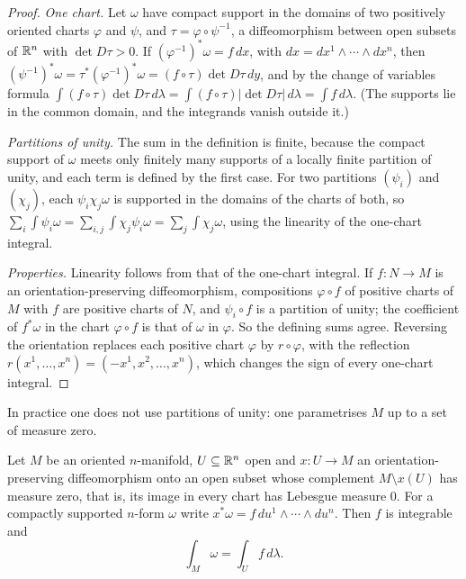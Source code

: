 \begin{proof}
\emph{One chart.} Let $\omega$ have compact support in the domains of two positively oriented charts $\varphi$ and $\psi$, and $\tau = \varphi \circ \psi^{-1}$, a diffeomorphism between open subsets of
$\mathbb{R}^n$ with $\det D\tau > 0$. If $(\varphi^{-1})^*\omega = f\,dx$, with $dx = dx^1 \wedge \cdots \wedge dx^n$, then $(\psi^{-1})^*\omega = \tau^*(\varphi^{-1})^*\omega = (f \circ \tau)\det D\tau\,dy$, and by the
change of variables formula $\int(f \circ \tau)\det D\tau\,d\lambda = \int(f \circ \tau)|\det D\tau|\,d\lambda = \int f\,d\lambda$. (The supports lie in the common domain, and the integrands vanish
outside it.)

\emph{Partitions of unity.} The sum in the definition is finite, because the compact support of $\omega$ meets only finitely many supports of a locally finite partition of unity, and
each term is defined by the first case. For two partitions $(\psi_i)$ and $(\chi_j)$, each $\psi_i\chi_j\omega$ is supported in the domains of the charts of both, so
$\sum_i\int\psi_i\omega = \sum_{i,j}\int\chi_j\psi_i\omega = \sum_j\int\chi_j\omega$, using the linearity of the one-chart integral.

\emph{Properties.} Linearity follows from that of the one-chart integral. If $f \colon N \to M$ is an orientation-preserving diffeomorphism, compositions $\varphi \circ f$ of positive charts of
$M$ with $f$ are positive charts of $N$, and $\psi_i \circ f$ is a partition of unity; the coefficient of $f^*\omega$ in the chart $\varphi \circ f$ is that of $\omega$ in $\varphi$. So the defining sums
agree. Reversing the orientation replaces each positive chart $\varphi$ by $r \circ \varphi$, with the reflection $r(x^1, \ldots, x^n) = (-x^1, x^2, \ldots, x^n)$, which changes the sign of every
one-chart integral.
\end{proof}

In practice one does not use partitions of unity: one parametrises $M$ up to a set of measure zero.

\begin{proposition}\label{differential-forms:proposition-integral-parametrisation}
Let $M$ be an oriented $n$-manifold, $U \subseteq \mathbb{R}^n$ open and $x \colon U \to M$ an orientation-preserving diffeomorphism onto an open subset whose complement $M \setminus x(U)$ has
measure zero, that is, its image in every chart has Lebesgue measure $0$. For a compactly supported $n$-form $\omega$ write $x^*\omega = f\,du^1 \wedge \cdots \wedge du^n$. Then $f$ is integrable
and
\[
\int_M\omega = \int_Uf\,d\lambda .
\]
\end{proposition}

